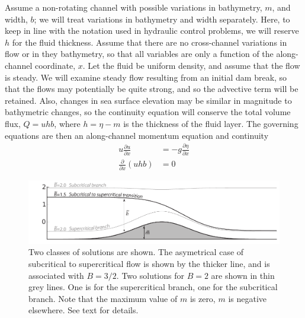 \documentclass[11pt]{report}
\numberwithin{equation}{section}
\begin{document}
Assume a non-rotating channel with possible variations in bathymetry, $m$, and width, $b$; we will treat variations in bathymetry and width separately.  Here, to keep in line with the notation used in hydraulic control problems, we will reserve $h$ for the fluid thickness.  Assume that there are no cross-channel variations in flow or in they bathymetry, so that all variables are only a function of the along-channel coordinate, $x$.  Let the fluid be uniform density, and assume that the flow is steady.  We will examine steady flow resulting from an initial dam break, so that the flows may potentially be quite strong, and so the advective term will be retained.  Also, changes in sea surface elevation may be similar in magnitude to bathymetric changes, so the continuity equation will conserve the total volume flux, $Q=u h b$, where $h=\eta-m$ is the thickness of the fluid layer.  The governing equations are then an along-channel momentum equation and continuity
\begin{align}
    u \frac{\partial u}{\partial x} &= -g \frac{\partial \eta}{\partial x} \\
    \frac{\partial}{\partial x}(u h b) &= 0
\end{align}

\begin{figure}[tb]
    \centering
    \includegraphics[width=6in]{hydraulic} 
    \caption{Two classes of solutions are shown.  The asymetrical case of subcritical to supercritical flow is shown by the thicker line, and is associated with $B=3/2$.  Two solutions for $B=2$ are shown in thin grey lines.  One is for the supercritical branch, one for the subcritical branch.  Note that the maximum value of $m$ is zero, $m$ is negative elsewhere.  See text for details.}
    \label{fig:hydraulic}
\end{figure}
\end{document}
